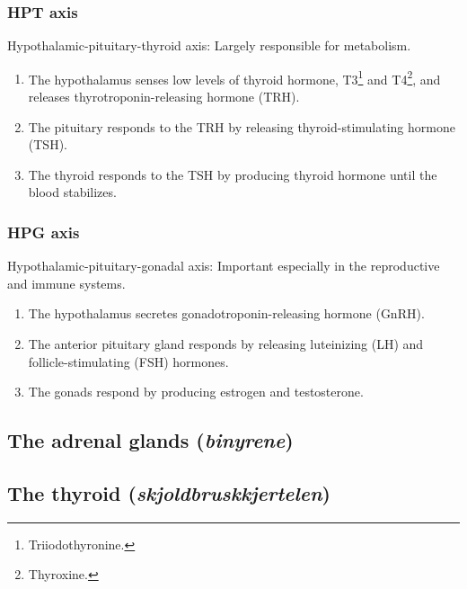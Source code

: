 \subsubsection{HPT axis}
Hypothalamic-pituitary-thyroid axis: Largely responsible for metabolism.
\begin{enumerate}
  \item The hypothalamus senses low levels of thyroid hormone, T3\footnote{Triiodothyronine.} and T4\footnote{Thyroxine.}, and releases  thyrotroponin-releasing hormone (TRH).
  \item The pituitary responds to the TRH by releasing thyroid-stimulating hormone (TSH).
  \item The thyroid responds to the TSH by producing thyroid hormone until the blood stabilizes.
\end{enumerate}

\subsubsection{HPG axis}
Hypothalamic-pituitary-gonadal axis: Important especially in the reproductive and immune systems.
\begin{enumerate}
  \item The hypothalamus secretes gonadotroponin-releasing hormone (GnRH).
  \item The anterior pituitary gland responds by releasing luteinizing (LH) and follicle-stimulating (FSH) hormones.
  \item The gonads respond by producing estrogen and testosterone.
\end{enumerate}

\subsection{The adrenal glands (\emph{binyrene})}

\subsection{The thyroid (\emph{skjoldbruskkjertelen})}


